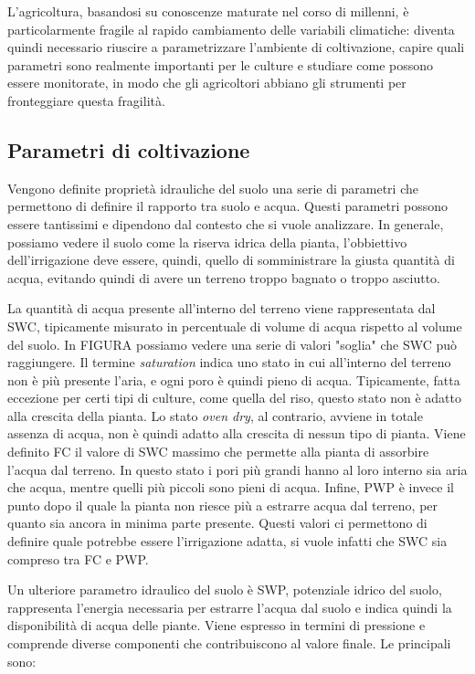 \documentclass[12pt,a4paper,openright,twoside]{book}
\begin{document}
L'agricoltura, basandosi su conoscenze maturate nel corso di millenni, è particolarmente fragile al rapido cambiamento delle variabili climatiche\cite{Janani2024}: diventa quindi necessario riuscire a parametrizzare l'ambiente di coltivazione, capire quali parametri sono realmente importanti per le culture e studiare come possono essere monitorate, in modo che gli agricoltori abbiano gli strumenti per fronteggiare questa fragilità\cite{Monteleone2023}.

\subsection{Parametri di coltivazione}\label{parametri-coltivazione}

Vengono definite proprietà idrauliche del suolo una serie di parametri che permettono di definire il rapporto tra suolo e acqua. Questi parametri possono essere tantissimi e dipendono dal contesto che si vuole analizzare.
In generale, possiamo vedere il suolo come la riserva idrica della pianta, l'obbiettivo dell'irrigazione deve essere, quindi, quello di somministrare la giusta quantità di acqua, evitando quindi di avere un terreno troppo bagnato o troppo asciutto.

La quantità di acqua presente all'interno del terreno viene rappresentata dal \ac{SWC}, tipicamente misurato in percentuale di volume di acqua rispetto al volume del suolo.
In FIGURA possiamo vedere una serie di valori "soglia" che \ac{SWC} può raggiungere.
Il termine \textit{saturation} indica uno stato in cui all'interno del terreno non è più presente l'aria, e ogni poro è quindi pieno di acqua. Tipicamente, fatta eccezione per certi tipi di culture, come quella del riso, questo stato non è adatto alla crescita della pianta.
Lo stato \textit{oven dry}, al contrario, avviene in totale assenza di acqua, non è quindi adatto alla crescita di nessun tipo di pianta.
Viene definito \ac{FC} il valore di \ac{SWC} massimo che permette alla pianta di assorbire l'acqua dal terreno. In questo stato i pori più grandi hanno al loro interno sia aria che acqua, mentre quelli più piccoli sono pieni di acqua.
Infine, \ac{PWP} è invece il punto dopo il quale la pianta non riesce più a estrarre acqua dal terreno, per quanto sia ancora in minima parte presente\cite{RAI2017505}.
Questi valori ci permettono di definire quale potrebbe essere l'irrigazione adatta, si vuole infatti che \ac{SWC} sia compreso tra \ac{FC} e \ac{PWP}.

Un ulteriore parametro idraulico del suolo è \ac{SWP}, potenziale idrico del suolo, rappresenta l'energia necessaria per estrarre l'acqua dal suolo e indica quindi la disponibilità di acqua delle piante. Viene espresso in termini di pressione e comprende diverse componenti che contribuiscono al valore finale\cite{MarshallT.J.TheoJohn1996Sp}. Le principali sono:
\end{document}
